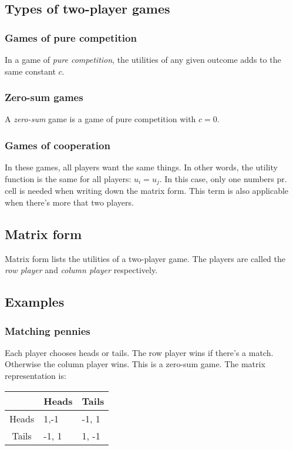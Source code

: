 \documentclass[12pt, a4paper]{article}
\begin{document}
\subsection{Types of two-player games}

\subsubsection{Games of pure competition}
In a game of \textit{pure competition}, the utilities of any given outcome adds to the same constant $c$.

\subsubsection{Zero-sum games}
A \textit{zero-sum} game is a game of pure competition with $c=0$.

\subsubsection{Games of cooperation}
In these games, all players want the same things. In other words, the utility function is the same for all players: $u_i=u_j$. In this case, only one numbers pr. cell is needed when writing down the matrix form. This term is also applicable when there's more that two players.

\subsection{Matrix form}
Matrix form lists the utilities of a two-player game. The players are called the \textit{row player} and \textit{column player} respectively.

\subsection{Examples}

\subsubsection{Matching pennies}
Each player chooses heads or tails. The row player wins if there's a match. Otherwise the column player wins. This is a zero-sum game. The matrix representation is:

\begin{table}[h]
\centering
\label{matrix:matching_pennies}
\begin{tabular}{c|l|l|}
\cline{2-3}
\multicolumn{1}{l|}{}   & \multicolumn{1}{c|}{Heads} & \multicolumn{1}{c|}{Tails} \\ \hline
\multicolumn{1}{|c|}{Heads} & 1,-1                   & -1, 1                  \\ \hline
\multicolumn{1}{|c|}{Tails} & -1, 1                  & 1, -1                 \\ \hline
\end{tabular}
\end{table}
\end{document}
